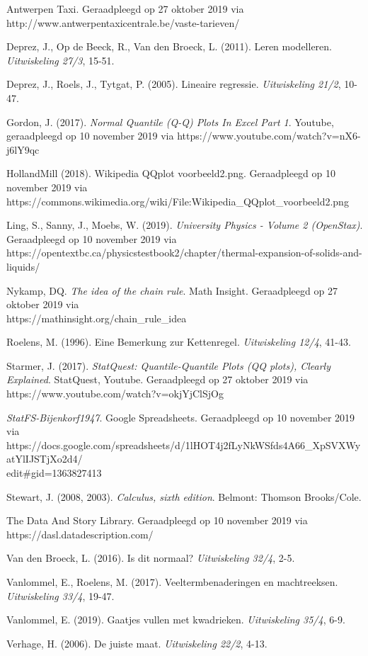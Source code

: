 \stopcontents[mainsections]			        %


\begin{bronnen}
\item Antwerpen Taxi. Geraadpleegd op 27 oktober 2019 via\\ http://www.antwerpentaxicentrale.be/vaste-tarieven/
\item Deprez, J., Op de Beeck, R., Van den Broeck, L. (2011). Leren modelleren. \emph{Uitwiskeling 27/3}, 15-51.
\item Deprez, J., Roels, J., Tytgat, P. (2005). Lineaire regressie. \emph{Uitwiskeling 21/2}, 10-47.
\item Gordon, J. (2017). \emph{Normal Quantile (Q-Q) Plots In Excel Part 1}. Youtube, geraadpleegd op 10 november 2019 via https://www.youtube.com/watch?v=nX6-j6lY9qc
\item HollandMill (2018). Wikipedia QQplot voorbeeld2.png. Geraadpleegd op 10 november 2019 via \\ https://commons.wikimedia.org/wiki/File:Wikipedia\_QQplot\_voorbeeld2.png
\item Ling, S., Sanny, J., Moebs, W. (2019). \emph{University Physics - Volume 2 (OpenStax)}. Geraadpleegd op 10 november 2019 via https://opentextbc.ca/physicstestbook2/chapter/thermal-expansion-of-solids-and-liquids/
\item Nykamp, DQ. \emph{The idea of the chain rule}. Math Insight. Geraadpleegd op 27 oktober 2019 via\\ https://mathinsight.org/chain\_rule\_idea
\item Roelens, M. (1996). Eine Bemerkung zur Kettenregel. \emph{Uitwiskeling 12/4}, 41-43.
\item Starmer, J. (2017). \emph{StatQuest: Quantile-Quantile Plots (QQ plots), Clearly Explained}. StatQuest, Youtube. Geraadpleegd op 27 oktober 2019 via https://www.youtube.com/watch?v=okjYjClSjOg
\item \emph{StatFS-Bijenkorf1947}. Google Spreadsheets. Geraadpleegd op 10 november 2019 via \\ https://docs.google.com/spreadsheets/d/1lHOT4j2fLyNkWSfds4A66\_XpSVXWyatYlIJSTjXo2d4/ \\edit\#gid=1363827413
\item Stewart, J. (2008, 2003). \emph{Calculus, sixth edition}. Belmont: Thomson Brooks/Cole.
\item The Data And Story Library. Geraadpleegd op 10 november 2019 via https://dasl.datadescription.com/
\item Van den Broeck, L. (2016). Is dit normaal? \emph{Uitwiskeling 32/4}, 2-5.
\item Vanlommel, E., Roelens, M. (2017). Veeltermbenaderingen en machtreeksen. \emph{Uitwiskeling 33/4}, 19-47.
\item Vanlommel, E. (2019). Gaatjes vullen met kwadrieken. \emph{Uitwiskeling 35/4}, 6-9.
\item Verhage, H. (2006). De juiste maat. \emph{Uitwiskeling 22/2}, 4-13.

\end{bronnen}

